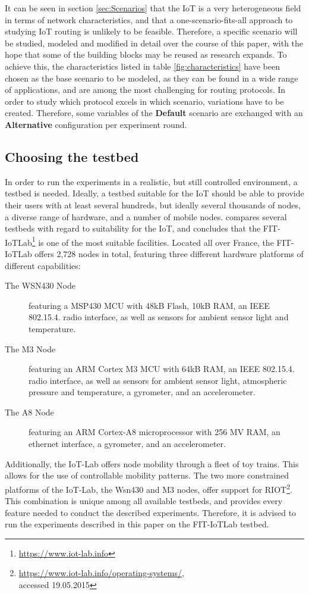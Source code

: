 \documentclass{acm_proc_article-sp}
\begin{document}
It can be seen in section \ref{sec:Scenarios} that the IoT is a very heterogeneous field in terms of network characteristics, and that a one-scenario-fits-all approach to studying IoT routing is unlikely to be feasible. Therefore, a specific scenario will be studied, modeled and modified in detail over the course of this paper, with the hope that some of the building blocks may be reused as research expands. To achieve this, the characteristics listed in table \ref{fig:characteristics} have been chosen as the base scenario to be modeled, as they can be found in a wide range of applications, and are among the most challenging for routing protocols.
In order to study which protocol excels in which scenario, variations have to be created. Therefore, some variables of the \textbf{Default} scenario are exchanged with an \textbf{Alternative} configuration per experiment round.

\subsection{Choosing the testbed}
\label{subsec:testbed_choice}
In order to run the experiments in a realistic, but still controlled environment, a testbed is needed. Ideally, a testbed suitable for the IoT should be able to provide their users with at least several hundreds, but ideally several thousands of nodes, a diverse range of hardware, and a number of mobile nodes. \cite{testbed-survey} compares several testbeds with regard to suitability for the IoT, and concludes that the FIT-IoTLab\footnote{ \url{https://www.iot-lab.info}} is one of the most suitable facilities. Located all over France, the FIT-IoTLab offers 2,728 nodes in total, featuring three different hardware platforms of different capabilities:
\begin{description}
\item[The WSN430 Node] featuring a MSP430 MCU with 48kB Flash, 10kB RAM, an IEEE 802.15.4. radio interface, as well as sensors for ambient sensor light and temperature.
\item[The M3 Node] featuring an ARM Cortex M3 MCU with 64kB RAM, an IEEE 802.15.4. radio interface, as well as sensors for ambient sensor light, atmospheric pressure and temperature, a gyrometer, and an accelerometer.
\item[The A8 Node] featuring an ARM Cortex-A8 microprocessor with 256 MV RAM, an ethernet interface, a gyrometer, and an accelerometer.
\end{description}
Additionally, the IoT-Lab offers node mobility through a fleet of toy trains. This allows for the use of controllable mobility patterns.
The two more constrained platforms of the IoT-Lab, the Wsn430 and M3 nodes, offer support for RIOT\cite{riot}\footnote{ \url{https://www.iot-lab.info/operating-systems/}, \\accessed 19.05.2015}.
This combination is unique among all available testbeds, and provides every feature needed to conduct the described experiments. Therefore, it is advised to run the experiments described in this paper on the FIT-IoTLab testbed.
\end{document}
